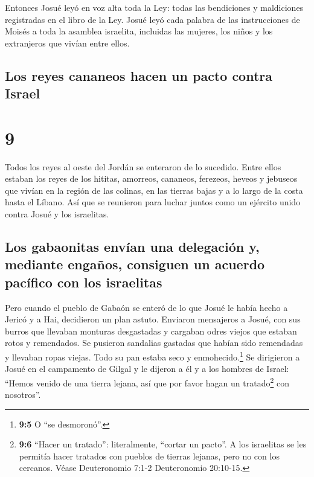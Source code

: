  Entonces Josué leyó en voz alta toda la Ley: todas las
bendiciones y maldiciones registradas en el libro de la Ley.
 Josué leyó cada palabra de las instrucciones de Moisés a
toda la asamblea israelita, incluidas las mujeres, los niños y los
extranjeros que vivían entre ellos.

\hypertarget{los-reyes-cananeos-hacen-un-pacto-contra-israel}{%
\subsection{Los reyes cananeos hacen un pacto contra
Israel}\label{los-reyes-cananeos-hacen-un-pacto-contra-israel}}

\hypertarget{section-8}{%
\section{9}\label{section-8}}

 Todos los reyes al oeste del Jordán se enteraron de lo
sucedido. Entre ellos estaban los reyes de los hititas, amorreos,
cananeos, ferezeos, heveos y jebuseos que vivían en la región de las
colinas, en las tierras bajas y a lo largo de la costa hasta el Líbano.
 Así que se reunieron para luchar juntos como un ejército
unido contra Josué y los israelitas.

\hypertarget{los-gabaonitas-envuxedan-una-delegaciuxf3n-y-mediante-engauxf1os-consiguen-un-acuerdo-pacuxedfico-con-los-israelitas}{%
\subsection{Los gabaonitas envían una delegación y, mediante engaños,
consiguen un acuerdo pacífico con los
israelitas}\label{los-gabaonitas-envuxedan-una-delegaciuxf3n-y-mediante-engauxf1os-consiguen-un-acuerdo-pacuxedfico-con-los-israelitas}}

 Pero cuando el pueblo de Gabaón se enteró de lo que Josué
le había hecho a Jericó y a Hai,  decidieron un plan
astuto. Enviaron mensajeros a Josué, con sus burros que llevaban
monturas desgastadas y cargaban odres viejos que estaban rotos y
remendados.  Se pusieron sandalias gastadas que habían
sido remendadas y llevaban ropas viejas. Todo su pan estaba seco y
enmohecido.\footnote{\textbf{9:5} O ``se desmoronó''.}  Se
dirigieron a Josué en el campamento de Gilgal y le dijeron a él y a los
hombres de Israel: ``Hemos venido de una tierra lejana, así que por
favor hagan un tratado\footnote{\textbf{9:6} ``Hacer un tratado'':
  literalmente, ``cortar un pacto''. A los israelitas se les permitía
  hacer tratados con pueblos de tierras lejanas, pero no con los
  cercanos. Véase Deuteronomio 7:1-2 Deuteronomio 20:10-15.} con
nosotros''.

